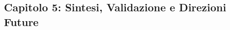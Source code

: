 \subsection{Capitolo 5: Sintesi, Validazione e Direzioni Future}

\label{ssec:struttura_cap5}


      
      






